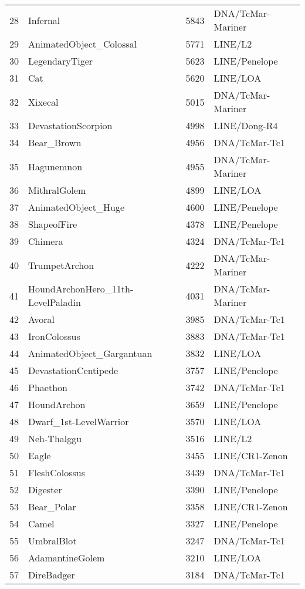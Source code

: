\begin{table}[ht]
\begin{tabular}{rlrl}
  28 & Infernal & 5843 & DNA/TcMar-Mariner  \\ 
  29 & AnimatedObject\_Colossal & 5771 & LINE/L2  \\ 
  30 & LegendaryTiger & 5623 & LINE/Penelope  \\ 
  31 & Cat & 5620 & LINE/LOA  \\ 
  32 & Xixecal & 5015 & DNA/TcMar-Mariner  \\ 
  33 & DevastationScorpion & 4998 & LINE/Dong-R4  \\ 
  34 & Bear\_Brown & 4956 & DNA/TcMar-Tc1  \\ 
  35 & Hagunemnon & 4955 & DNA/TcMar-Mariner  \\ 
  36 & MithralGolem & 4899 & LINE/LOA  \\ 
  37 & AnimatedObject\_Huge & 4600 & LINE/Penelope  \\ 
  38 & ShapeofFire & 4378 & LINE/Penelope  \\ 
  39 & Chimera & 4324 & DNA/TcMar-Tc1  \\ 
  40 & TrumpetArchon & 4222 & DNA/TcMar-Mariner  \\ 
  41 & HoundArchonHero\_11th-LevelPaladin & 4031 & DNA/TcMar-Mariner  \\ 
  42 & Avoral & 3985 & DNA/TcMar-Tc1  \\ 
  43 & IronColossus & 3883 & DNA/TcMar-Tc1  \\ 
  44 & AnimatedObject\_Gargantuan & 3832 & LINE/LOA  \\ 
  45 & DevastationCentipede & 3757 & LINE/Penelope  \\ 
  46 & Phaethon & 3742 & DNA/TcMar-Tc1  \\ 
  47 & HoundArchon & 3659 & LINE/Penelope  \\ 
  48 & Dwarf\_1st-LevelWarrior & 3570 & LINE/LOA  \\ 
  49 & Neh-Thalggu & 3516 & LINE/L2  \\ 
  50 & Eagle & 3455 & LINE/CR1-Zenon  \\ 
  51 & FleshColossus & 3439 & DNA/TcMar-Tc1  \\ 
  52 & Digester & 3390 & LINE/Penelope  \\ 
  53 & Bear\_Polar & 3358 & LINE/CR1-Zenon  \\ 
  54 & Camel & 3327 & LINE/Penelope  \\ 
  55 & UmbralBlot & 3247 & DNA/TcMar-Tc1  \\ 
  56 & AdamantineGolem & 3210 & LINE/LOA  \\ 
  57 & DireBadger & 3184 & DNA/TcMar-Tc1  \\ 

\end{tabular}
\end{table}
